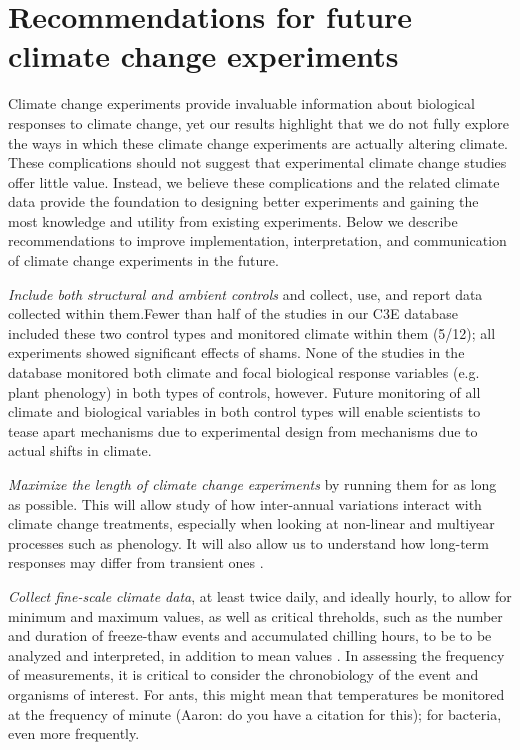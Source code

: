 \documentclass{article}
\begin{document}
\section*{Recommendations for future climate change experiments}
 \par Climate change experiments provide invaluable information about biological responses to climate change, yet our results highlight that we do not fully explore the ways in which these climate change experiments are actually altering climate. These complications should not suggest that experimental climate change studies offer little value. Instead, we believe these complications and the related climate data provide the foundation to designing better experiments and gaining the most knowledge and utility from existing experiments. Below we describe recommendations to improve implementation, interpretation, and communication of climate change experiments in the future.
\par\textit{Include both structural and ambient controls} and collect, use, and report data collected within them.Fewer than half of the studies in our C3E database included these two control types and monitored climate within them (5/12); all experiments showed significant effects of shams. None of the studies in the database monitored both climate and focal biological response variables (e.g. plant phenology) in both types of controls, however. Future monitoring of all climate and biological variables in both control types will enable scientists to tease apart mechanisms due to experimental design from mechanisms due to actual shifts in climate.  
\par\textit{Maximize the length of climate change experiments} by running them for as long as possible. This will allow study of how inter-annual variations interact with climate change treatments, especially when looking at non-linear and multiyear processes such as phenology. It will also allow us to understand how long-term responses may differ from  transient ones \citep{franklin1989,giasson2013}. 
\par\textit{Collect fine-scale climate data}, at least twice daily, and ideally hourly, to allow for minimum and maximum values, as well as critical threholds, such as the number and duration of freeze-thaw events and accumulated chilling hours, to be to be analyzed and interpreted, in addition to mean values \citep{mcdaniel2014}. In assessing the frequency of measurements, it is critical to consider the chronobiology of the event and organisms of interest. For ants, this might mean that temperatures be monitored at the frequency of minute (Aaron: do you have a citation for this); for bacteria, even more frequently.
\end{document}

